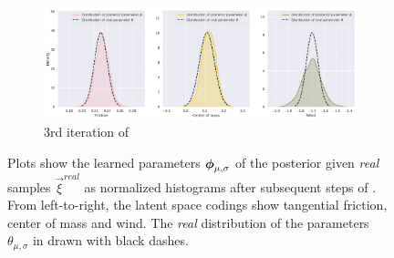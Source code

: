 \begin{figure}
\begin{subfigure}{\textwidth}
  \includegraphics[width=1.0\linewidth]{img/windyslope/latent-representation/new/latent_encoding_iter3}
  \caption{3rd iteration of \dettostoc{}}
\end{subfigure}
\caption{Plots show the learned parameters $\boldsymbol{\phi}_{\mu, \sigma}$ of the posterior given \emph{real} samples $\vec{\xi}^{real}$ as normalized histograms after subsequent steps of \dettostoc{}.
From left-to-right, the latent space codings show tangential friction, center of mass and wind. %
The \emph{real} distribution of the parameters $\theta_{\mu, \sigma}$ in drawn with black dashes.}
\label{fig:windyslope_latent_space_full}
\end{figure}

